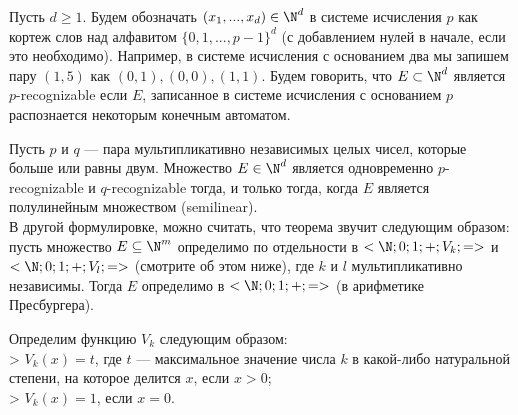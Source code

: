     \begin{Rem}
        Пусть $d \geq 1$. Будем обозначать $(x_1, ..., x_d) \in \N^d$ в системе исчисления $p$ как кортеж слов над алфавитом $\{0, 1, ..., p - 1\}^d$ (с добавлением нулей в начале, если это необходимо). Например, в системе исчисления с основанием два мы запишем пару $(1,5)$ как $(0,1), (0,0), (1,1)$. Будем говорить, что $E \subset \N^d$ является $p$-recognizable если $E$, записанное в системе исчисления с основанием $p$ распознается некоторым конечным автоматом.
    \end{Rem}
    
    \begin{Thm}
        Пусть $p$ и $q$ --- пара мультипликативно независимых целых чисел, которые больше или равны двум. Множество $E \in \N^d$ является одновременно $p$-recognizable и $q$-recognizable тогда, и только тогда, когда $E$ является полулинейным множеством (semilinear).\\
        В другой формулировке, можно считать, что теорема звучит следующим образом:\\
        пусть множество $E \subseteq \N^m$ определимо по отдельности в $<\N; 0; 1; +; V_k; =>$ и $<\N; 0; 1; +; V_l; =>$ (смотрите об этом ниже), где $k$ и $l$ мультипликативно независимы. Тогда $E$ определимо в $<\N; 0; 1; +; =>$ (в арифметике Пресбургера).
    \end{Thm}

    
    \begin{Def}[Функция $V_k$]
        Определим функцию $V_k$ следующим образом:\\
        > $V_k(x) = t$, где $t$ --- максимальное значение числа $k$ в какой-либо натуральной степени, на которое делится $x$, если $x > 0$;\\
        > $V_k(x) = 1$, если $x = 0$.
    \end{Def}
    
